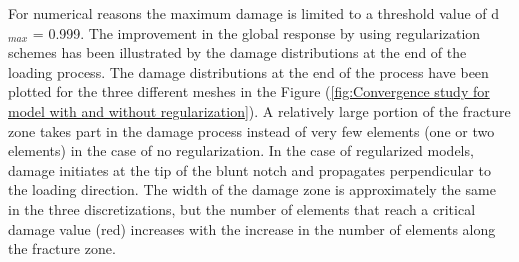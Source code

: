 \documentclass[12pt,a4paper,twoside,openright]{report}
\begin{document}
\indent\indent\indent  For numerical reasons the maximum damage is limited to a threshold value of d$_{max}$ = 0.999. The improvement in the global response by using regularization schemes has been illustrated by the damage distributions at the end of the loading process. The damage distributions at the end of the process have been plotted for the three different meshes in the Figure (\ref{fig:Convergence study for model with and without regularization}). A relatively large portion of the fracture zone takes part in the damage process instead of very few elements (one or two elements) in the case of no regularization. In the case of regularized models, damage initiates at the tip of the blunt notch and propagates perpendicular to the loading direction. The width of the damage zone is approximately the same in the three discretizations, but the number of elements that reach a critical damage value (red) increases with the increase in the number of elements along the fracture zone.\\
\end{document}
